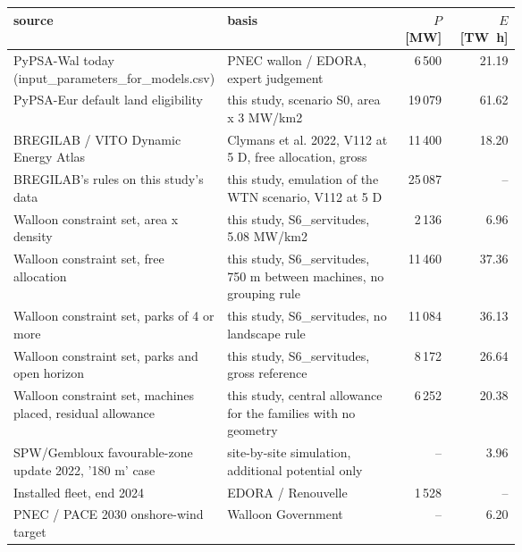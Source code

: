 \begin{tabular}{p{0.32\linewidth}p{0.34\linewidth}rr}
\toprule
source & basis & $P$ [\si{\mega\watt}] & $E$ [\si{\tera\watt\hour}] \\
\midrule
PyPSA-Wal today (input\_parameters\_for\_models.csv) & PNEC wallon / EDORA, expert judgement & 6\,500 & 21.19 \\
PyPSA-Eur default land eligibility & this study, scenario S0, area x 3 MW/km2 & 19\,079 & 61.62 \\
BREGILAB / VITO Dynamic Energy Atlas & Clymans et al. 2022, V112 at 5 D, free allocation, gross & 11\,400 & 18.20 \\
BREGILAB's rules on this study's data & this study, emulation of the WTN scenario, V112 at 5 D & 25\,087 & -- \\
Walloon constraint set, area x density & this study, S6\_servitudes, 5.08 MW/km2 & 2\,136 & 6.96 \\
Walloon constraint set, free allocation & this study, S6\_servitudes, 750 m between machines, no grouping rule & 11\,460 & 37.36 \\
Walloon constraint set, parks of 4 or more & this study, S6\_servitudes, no landscape rule & 11\,084 & 36.13 \\
Walloon constraint set, parks and open horizon & this study, S6\_servitudes, gross reference & 8\,172 & 26.64 \\
Walloon constraint set, machines placed, residual allowance & this study, central allowance for the families with no geometry & 6\,252 & 20.38 \\
SPW/Gembloux favourable-zone update 2022, '180 m' case & site-by-site simulation, additional potential only & -- & 3.96 \\
Installed fleet, end 2024 & EDORA / Renouvelle & 1\,528 & -- \\
PNEC / PACE 2030 onshore-wind target & Walloon Government & -- & 6.20 \\
\bottomrule
\end{tabular}